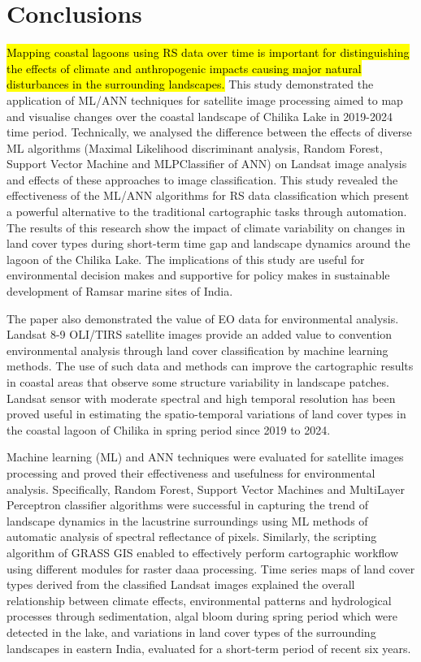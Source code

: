 \documentclass[jmse,article,submit,pdftex,moreauthors]{Definitions/mdpi}
\begin{document}
\section{Conclusions}

\hl{Mapping coastal lagoons using RS data over time is important for distinguishing the effects of climate and anthropogenic impacts causing major natural disturbances in the surrounding landscapes. }This study demonstrated the application of ML/ANN techniques for satellite image processing aimed to map and visualise changes over the coastal landscape of Chilika Lake in 2019-2024 time period. Technically, we analysed the difference between the effects of diverse ML algorithms (Maximal Likelihood discriminant analysis, Random Forest, Support Vector Machine and MLPClassifier of ANN) on Landsat image analysis and effects of these approaches to image classification. This study revealed the effectiveness of the ML/ANN algorithms for RS data classification which present a powerful alternative to the traditional cartographic tasks through automation. The results of this research show the impact of climate variability on changes in land cover types during short-term time gap and landscape dynamics around the lagoon of the Chilika Lake. The implications of this study are useful for environmental decision makes and supportive for policy makes in sustainable development of Ramsar marine sites of India.

The paper also demonstrated the value of EO data for environmental analysis. Landsat 8-9 OLI/TIRS satellite images provide an added value to convention environmental analysis through land cover classification by machine learning methods. The use of such data and methods can improve the cartographic results in coastal areas that observe some structure variability in landscape patches. Landsat sensor with moderate spectral and high temporal resolution has been proved useful in estimating the spatio-temporal variations of land cover types in the coastal lagoon of Chilika in spring period since 2019 to 2024. 

Machine learning (ML) and ANN techniques were evaluated for satellite images processing and proved their effectiveness and usefulness for environmental analysis. Specifically, Random Forest, Support Vector Machines and MultiLayer Perceptron classifier algorithms were successful in capturing the trend of landscape dynamics in the lacustrine surroundings using ML methods of automatic analysis of spectral reflectance of pixels. Similarly, the scripting algorithm of GRASS GIS enabled to effectively perform cartographic workflow using different modules for raster daaa processing. Time series maps of land cover types derived from the classified Landsat images explained the overall relationship between climate effects, environmental patterns and hydrological processes through sedimentation, algal bloom during spring period which were detected in the lake, and  variations in land cover types of the surrounding landscapes in eastern India, evaluated for a short-term period of recent six years.
\end{document}
